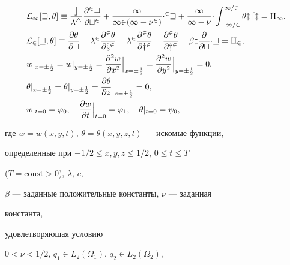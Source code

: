 \begin{align}


&\cal L_1[w,\theta]\equiv \frac{c}{\lambda^4}


\frac{\partial^2w}{\partial t^2}+


\frac{1}{12(1-\nu^2)}\Delta^2w+\frac{1}{1-\nu}\Delta


\int^{1/2}_{-1/2}\theta z\,dz=q_1,\\


&\cal L_2[w,\theta]\equiv


\frac{\partial\theta}{\partial t}-\lambda^2


\frac{\partial^2\theta}{\partial x^2}-\lambda^2


\frac{\partial^2\theta}{\partial y^2}-


\frac{\partial^2\theta}{\partial z^2}-\beta z


\frac{\partial}{\partial t}\Delta w=q_2,\\


&w|_{x=\pm\frac{1}{2}}=w|_{y=\pm\frac{1}{2}}=


\Bigl.\frac{\partial^2w}{\partial x^2}\Bigr|_{x=\pm\frac{1}{2}}=


\Bigl.\frac{\partial^2w}{\partial y^2}\Bigr|_{y=\pm\frac{1}{2}}


=0,\\


&\theta|_{x=\pm\frac{1}{2}}=\theta|_{y=\pm\frac{1}{2}}=


\Bigl.\frac{\partial\theta}{\partial z}\Bigr|_{z=\pm\frac{1}{2}}


=0,\\


&w|_{t=0}=\varphi_0,\quad


\Bigl.\frac{\partial w}{\partial t}\Bigr|_{t=0}=\varphi_1,\quad


\theta|_{t=0}=\psi_0,


\end{align}


где $w=w(x,y,t)$, $\theta=\theta(x,y,z,t)$ --- искомые функции,


определенные при $-1/2\le x,y,z\le 1/2$, $0\le t\le T$


($T=\text{const}>0$), $\lambda$, $c$,


$\beta$ --- заданные положительные константы, $\nu$ --- заданная


константа,


удовлетворяющая условию


$0<\nu<1/2$, $q_1\in L_2(\Omega_1)$, $q_2\in L_2(\Omega_2)$,


